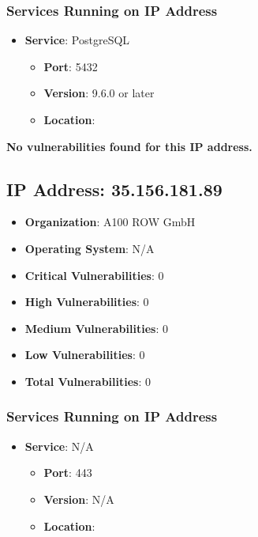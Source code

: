 \documentclass{article}
\begin{document}
\subsubsection*{Services Running on IP Address}

\begin{itemize}
    
        \item \textbf{Service}: PostgreSQL
        \begin{itemize}
            \item \textbf{Port}: 5432
            \item \textbf{Version}:  9.6.0 or later 
            \item \textbf{Location}: \href{  }{  }
        \end{itemize}
    
\end{itemize}


\textbf{No vulnerabilities found for this IP address.}




\clearpage



\subsection*{IP Address: 35.156.181.89}

\begin{itemize}
    \item \textbf{Organization}: A100 ROW GmbH
    \item \textbf{Operating System}:  N/A 
    \item \textbf{Critical Vulnerabilities}: 0
    \item \textbf{High Vulnerabilities}: 0
    \item \textbf{Medium Vulnerabilities}: 0
    \item \textbf{Low Vulnerabilities}: 0
    \item \textbf{Total Vulnerabilities}: 0
\end{itemize}

\subsubsection*{Services Running on IP Address}

\begin{itemize}
    
        \item \textbf{Service}: N/A
        \begin{itemize}
            \item \textbf{Port}: 443
            \item \textbf{Version}:  N/A 
            \item \textbf{Location}: \href{  }{  }
        \end{itemize}
    
\end{itemize}
\end{document}
